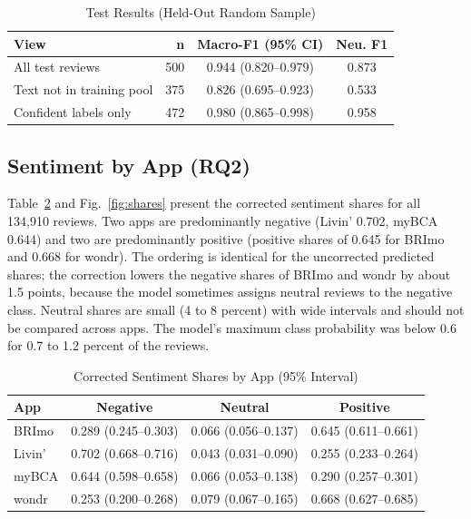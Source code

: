 \documentclass[conference]{IEEEtran}
\begin{document}
\begin{table}[htbp]
\caption{Test Results (Held-Out Random Sample)}
\begin{center}
\footnotesize
\begin{tabular}{|l|r|c|c|}
\hline
\textbf{View} & \textbf{n} & \textbf{Macro-F1 (95\% CI)} & \textbf{Neu. F1} \\
\hline
All test reviews & 500 & 0.944 (0.820--0.979) & 0.873 \\
Text not in training pool & 375 & 0.826 (0.695--0.923) & 0.533 \\
Confident labels only & 472 & 0.980 (0.865--0.998) & 0.958 \\
\hline
\end{tabular}
\label{tab:test}
\end{center}
\end{table}

\subsection{Sentiment by App (RQ2)}
Table~\ref{tab:shares} and Fig.~\ref{fig:shares} present the corrected sentiment shares for all 134,910 reviews. Two apps are predominantly negative (Livin' 0.702, myBCA 0.644) and two are predominantly positive (positive shares of 0.645 for BRImo and 0.668 for wondr). The ordering is identical for the uncorrected predicted shares; the correction lowers the negative shares of BRImo and wondr by about 1.5 points, because the model sometimes assigns neutral reviews to the negative class. Neutral shares are small (4 to 8 percent) with wide intervals and should not be compared across apps. The model's maximum class probability was below 0.6 for 0.7 to 1.2 percent of the reviews.

\begin{table}[htbp]
\caption{Corrected Sentiment Shares by App (95\% Interval)}
\begin{center}
\scriptsize
\setlength{\tabcolsep}{2.5pt}
\begin{tabular}{|l|c|c|c|}
\hline
\textbf{App} & \textbf{Negative} & \textbf{Neutral} & \textbf{Positive} \\
\hline
BRImo & 0.289 (0.245--0.303) & 0.066 (0.056--0.137) & 0.645 (0.611--0.661) \\
Livin' & 0.702 (0.668--0.716) & 0.043 (0.031--0.090) & 0.255 (0.233--0.264) \\
myBCA & 0.644 (0.598--0.658) & 0.066 (0.053--0.138) & 0.290 (0.257--0.301) \\
wondr & 0.253 (0.200--0.268) & 0.079 (0.067--0.165) & 0.668 (0.627--0.685) \\
\hline
\end{tabular}
\label{tab:shares}
\end{center}
\end{table}
\end{document}
